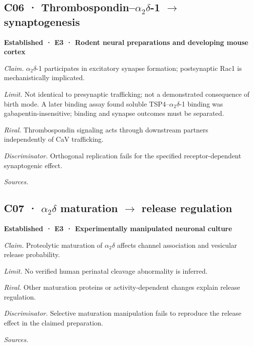 \subsection*{C06 · Thrombospondin–\ensuremath{\alpha_2\delta}-1 \ensuremath{\rightarrow} synaptogenesis}
\noindent\textbf{Established · E3 · Rodent neural preparations and developing mouse cortex}\par
\textit{Claim.} \ensuremath{\alpha_2\delta}-1 participates in excitatory synapse formation; postsynaptic Rac1 is mechanistically implicated.\par
\textit{Limit.} Not identical to presynaptic trafficking; not a demonstrated consequence of birth mode. A later binding assay found soluble TSP4–\ensuremath{\alpha_2\delta}-1 binding was gabapentin-insensitive; binding and synapse outcomes must be separated.\par
\textit{Rival.} Thrombospondin signaling acts through downstream partners independently of CaV trafficking.\par
\textit{Discriminator.} Orthogonal replication fails for the specified receptor-dependent synaptogenic effect.\par
\textit{Sources.} \cite{ref10,ref11,ref31}\par
\subsection*{C07 · \ensuremath{\alpha_2\delta} maturation \ensuremath{\rightarrow} release regulation}
\noindent\textbf{Established · E3 · Experimentally manipulated neuronal culture}\par
\textit{Claim.} Proteolytic maturation of \ensuremath{\alpha_2\delta} affects channel association and vesicular release probability.\par
\textit{Limit.} No verified human perinatal cleavage abnormality is inferred.\par
\textit{Rival.} Other maturation proteins or activity-dependent changes explain release regulation.\par
\textit{Discriminator.} Selective maturation manipulation fails to reproduce the release effect in the claimed preparation.\par
\textit{Sources.} \cite{ref12}\par

